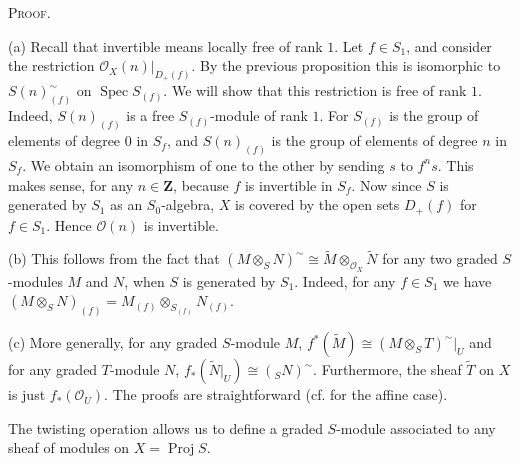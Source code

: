 {\smallskip
\noindent\textsc{Proof.}\par
(a) Recall that invertible means locally free of rank $1$. Let $f\in S_1$, and consider the restriction $\mathcal O_X(n)|_{D_+(f)}$. By the previous proposition this is isomorphic to $S(n)_{(f)}^\sim$ on $\operatorname{Spec}S_{(f)}$. We will show that this restriction is free of rank $1$. Indeed, $S(n)_{(f)}$ is a free $S_{(f)}$-module of rank $1$. For $S_{(f)}$ is the group of elements of degree $0$ in $S_f$, and $S(n)_{(f)}$ is the group of elements of degree $n$ in $S_f$. We obtain an isomorphism of one to the other by sending $s$ to $f^ns$. This makes sense, for any $n\in\mathbf Z$, because $f$ is invertible in $S_f$. Now since $S$ is generated by $S_1$ as an $S_0$-algebra, $X$ is covered by the open sets $D_+(f)$ for $f\in S_1$. Hence $\mathcal O(n)$ is invertible.

(b) This follows from the fact that $(M\otimes_S N)^\sim\cong\widetilde M\otimes_{\mathcal O_X}\widetilde N$ for any two graded $S$-modules $M$ and $N$, when $S$ is generated by $S_1$. Indeed, for any $f\in S_1$ we have $(M\otimes_S N)_{(f)}=M_{(f)}\otimes_{S_{(f)}}N_{(f)}$.

(c) More generally, for any graded $S$-module $M$, $f^*(\widetilde M)\cong(M\otimes_S T)^\sim|_U$ and for any graded $T$-module $N$, $f_*(\widetilde N|_U)\cong({}_SN)^\sim$. Furthermore, the sheaf $\widetilde T$ on $X$ is just $f_*(\mathcal O_U)$. The proofs are straightforward (cf.  for the affine case).

\medskip
The twisting operation allows us to define a graded $S$-module associated to any sheaf of modules on $X=\operatorname{Proj}S$.
}
